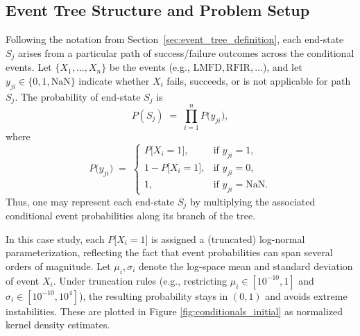 \subsection{Event Tree Structure and Problem Setup}
Following the notation from Section~\ref{sec:event_tree_definition}, each end-state \(S_j\) arises from a particular path of success/failure outcomes across the conditional events. Let \(\{X_1,\dots,X_n\}\) be the events (e.g., \(\text{LMFD}, \text{RFIR}, \dots\)), and let \(y_{ji}\in\{0,1,\text{NaN}\}\) indicate whether \(X_i\) fails, succeeds, or is not applicable for path \(S_j\). The probability of end-state \(S_j\) is
\begin{equation}
\label{eq:ebr2_es_probability}
P(S_j) 
\;=\;
\prod_{i=1}^{n} P\bigl(y_{ji}\bigr),
\end{equation}
where 
\begin{equation}
P\bigl(y_{ji}\bigr)
\;=\;
\begin{cases}
P\bigl[X_i = 1\bigr], & \text{if } y_{ji}=1,\\
1 - P\bigl[X_i = 1\bigr], & \text{if } y_{ji}=0,\\
1, & \text{if } y_{ji}=\text{NaN}.
\end{cases}
\label{eq:ebr2_conditional}
\end{equation}
Thus, one may represent each end-state \(S_j\) by multiplying the associated conditional event probabilities along its branch of the tree.

In this case study, each \(P\bigl[X_i=1\bigr]\) is assigned a (truncated) log-normal parameterization, reflecting the fact that event probabilities can span several orders of magnitude. Let \(\mu_i,\sigma_i\) denote the log-space mean and standard deviation of event \(X_i\). Under truncation rules (e.g., restricting \(\mu_i\in[10^{-10},1]\) and \(\sigma_i\in[10^{-10},10^{4}]\)), the resulting probability stays in \((0,1)\) and avoids extreme instabilities. These are plotted in Figure \ref{fig:conditionals_initial} as normalized kernel density estimates\cite{terrell_variable_1992}.

